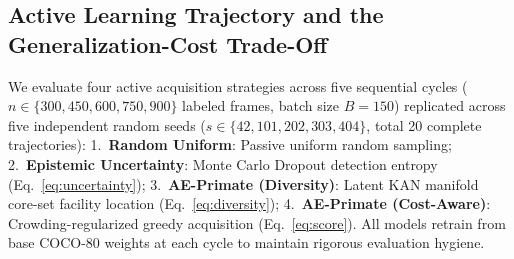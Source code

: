 \documentclass[conference]{IEEEtran}
\begin{document}
\begin{table}[t]
\centering
\caption{Active Learning Benchmark on Held-Out Validation ($\mathcal{D}_\text{val}$) and Sealed Test Split ($\mathcal{D}_\text{test}$, 3,206 frames, 7 unseen camera stations in Nkhotakota Reserve). Cumulative bounding boxes measured at Cycle~4 ($n=900$ frames). Mean $\pm$ SEM over $N=5$ independent seeds.}
\label{tab:al_benchmark}
\end{table}

\subsection{Active Learning Trajectory and the Generalization-Cost Trade-Off}
\label{sec:al_results}
We evaluate four active acquisition strategies across five sequential cycles ($n \in \{300, 450, 600, 750, 900\}$ labeled frames, batch size $B=150$) replicated across five independent random seeds ($s \in \{42, 101, 202, 303, 404\}$, total 20 complete trajectories):
1.~\textbf{Random Uniform}: Passive uniform random sampling;
2.~\textbf{Epistemic Uncertainty}: Monte Carlo Dropout detection entropy (Eq.~\ref{eq:uncertainty});
3.~\textbf{AE-Primate (Diversity)}: Latent KAN manifold core-set facility location (Eq.~\ref{eq:diversity});
4.~\textbf{AE-Primate (Cost-Aware)}: Crowding-regularized greedy acquisition (Eq.~\ref{eq:score}).
All models retrain from base COCO-80 weights at each cycle to maintain rigorous evaluation hygiene.
\end{document}
